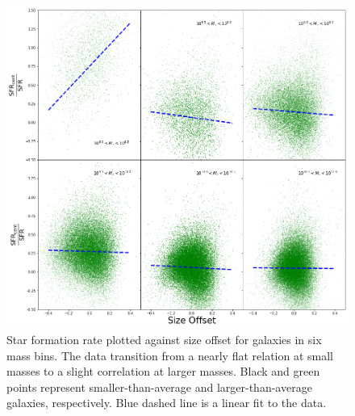 \documentclass[iop]{emulateapj}
\begin{document}
\begin{figure}
	\centering
	\includegraphics[width=1.5 \columnwidth]{excess_2x3.png}
	\caption{Star formation rate plotted against size offset for galaxies in six mass bins. The data transition from a nearly flat relation at small masses to a slight correlation at larger masses. Black and green points represent smaller-than-average and larger-than-average galaxies, respectively. Blue dashed line is a linear fit to the data.}
	\label{fig:sfr_ex}
	
\end{figure}
\end{document}
